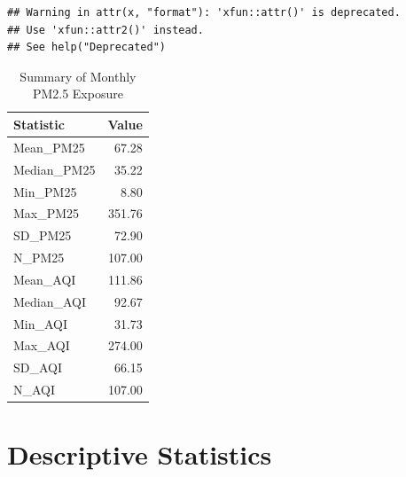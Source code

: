 \documentclass[
]{article}
\begin{document}
\begin{verbatim}
## Warning in attr(x, "format"): 'xfun::attr()' is deprecated.
## Use 'xfun::attr2()' instead.
## See help("Deprecated")
\end{verbatim}

\begin{longtable}[t]{lr}
\caption{\label{tab:Sumamry Staistics}Summary of Monthly PM2.5 Exposure}\\
\toprule
Statistic & Value\\
\midrule
Mean\_PM25 & 67.28\\
Median\_PM25 & 35.22\\
Min\_PM25 & 8.80\\
Max\_PM25 & 351.76\\
SD\_PM25 & 72.90\\
\addlinespace
N\_PM25 & 107.00\\
Mean\_AQI & 111.86\\
Median\_AQI & 92.67\\
Min\_AQI & 31.73\\
Max\_AQI & 274.00\\
\addlinespace
SD\_AQI & 66.15\\
N\_AQI & 107.00\\
\bottomrule
\end{longtable}

\section{Descriptive Statistics}\label{descriptive-statistics}
\end{document}
